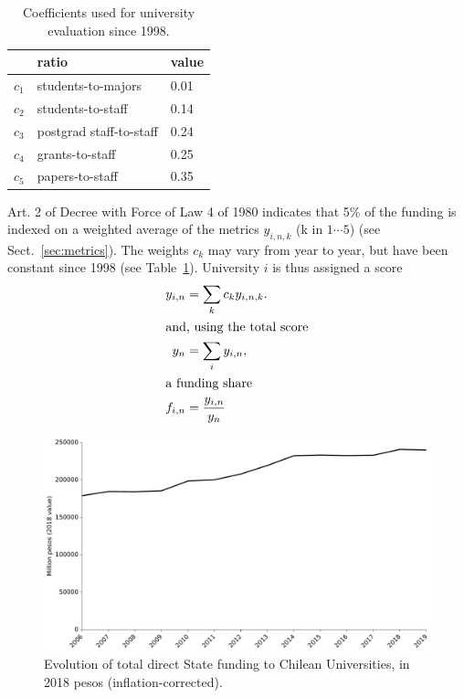 \documentclass[twocolumn]{article}
\begin{document}
\begin{table}
\centering
\caption{Coefficients used for university evaluation since 1998.}
\label{tab:coeff}
\begin{tabular}{lll}
\hline\hline
      & ratio                   & value\\
\hline
$c_1$ & students-to-majors      & 0.01\\
$c_2$ & students-to-staff       & 0.14\\
$c_3$ & postgrad staff-to-staff & 0.24\\
$c_4$ & grants-to-staff         & 0.25\\
$c_5$ & papers-to-staff         & 0.35\\
\hline
\end{tabular}
\end{table}


Art. 2 of Decree with Force of Law 4 of 1980 indicates that 5\% of the funding
is indexed on a weighted average of the metrics $y_{i,n,k}$ (k in $1\cdots5$)
(see Sect.~\ref{sec:metrics}). The weights $c_k$ may vary from year to year,
but have been constant since 1998 (see Table~\ref{tab:coeff}).  University $i$
is thus assigned a score
\begin{subequations}
\begin{align}
    y_{i,n}    &= \sum_k c_k y_{i,n,k}. \label{eq:y}\\
\intertext{and, using the total score}
    y_{n}      &= \sum_i y_{i,n},\\
\intertext{a funding share}
    f_{i,n}    &= \frac{y_{i,n}}{y_{n}} \label{eq:f}
\end{align}
\end{subequations}


\begin{figure}
\centering
\includegraphics[width=\linewidth]{pdf/total-afd-timeseries.pdf}
\caption{Evolution of total direct State funding to Chilean Universities, in 2018
pesos (inflation-corrected).}
\label{fig:total-afd}
\end{figure}
\end{document}
